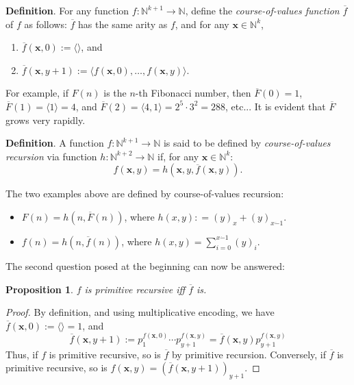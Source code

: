 \documentclass[12pt]{article}
\newtheorem{prop}{Proposition}
\begin{document}
\textbf{Definition}.  For any function $f:\mathbb{N}^{k+1}\to \mathbb{N}$, define the \emph{course-of-values function} $\overline{f}$ of $f$ as follows: $\overline{f}$ has the same arity as $f$, and for any $\boldsymbol{x}\in \mathbb{N}^k$,
\begin{enumerate}
\item $\overline{f}(\boldsymbol{x},0):=\langle \rangle $, and
\item $\overline{f}(\boldsymbol{x},y+1):= \langle f(\boldsymbol{x},0), \ldots, f(\boldsymbol{x},y)\rangle$.
\end{enumerate}

For example, if $F(n)$ is the $n$-th Fibonacci number, then $\overline{F}(0)=1$, $\overline{F}(1)=\langle 1 \rangle = 4$, and $\overline{F}(2)=\langle 4,1 \rangle = 2^5\cdot 3^2 = 288$, etc...  It is evident that $\overline{F}$ grows very rapidly.

\textbf{Definition}.  A function $f:\mathbb{N}^{k+1}\to \mathbb{N}$ is said to be defined by \emph{course-of-values recursion} via function $h:\mathbb{N}^{k+2} \to \mathbb{N}$ if, for any $\boldsymbol{x} \in \mathbb{N}^k$:
$$f(\boldsymbol{x},y) = h(\boldsymbol{x},y, \overline{f}(\boldsymbol{x},y) ).$$

The two examples above are defined by course-of-values recursion:
\begin{itemize}
\item $F(n)=h(n,\overline{F}(n))$, where $h(x,y): = (y)_x + (y)_{x \dot{-} 1}$.
\item $f(n)=h(n,\overline{f}(n))$, where $ h(x,y)= \sum_{i=0}^{x \dot{-}1} (y)_i$.
\end{itemize}

The second question posed at the beginning can now be answered:

\begin{prop} $f$ is primitive recursive iff $\overline{f}$ is.  \end{prop} 
\begin{proof}  By definition, and using multiplicative encoding, we have $\overline{f}(\boldsymbol{x},0):=\langle \rangle=1 $, and $$\overline{f}(\boldsymbol{x},y+1):= p_1^{f(\boldsymbol{x},0)} \cdots p_{y+1}^{f(\boldsymbol{x},y)} = \overline{f}(\boldsymbol{x},y) p_{y+1}^{f(\boldsymbol{x},y)} $$
Thus, if $f$ is primitive recursive, so is $\overline{f}$ by primitive recursion.  Conversely, if $\overline{f}$ is primitive recursive, so is $f(\boldsymbol{x},y)=(\overline{f}(\boldsymbol{x},y+1))_{y+1}$.
\end{proof}
\end{document}
